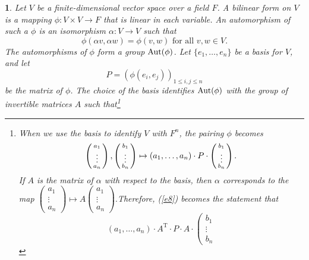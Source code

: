 \documentclass[a4paper,11pt,final]{memoir}%
\newtheorem{plain}[X]{}
\theoremstyle{nonumberplain}
\begin{document}
\begin{plain}
\label{bd3f}Let $V$ be a finite-dimensional vector space over a field $F$. A
bilinear form on $V$ is a mapping $\phi\colon V\times V\rightarrow F$ that is
linear in each variable. An \emph{automorphism}%
of such a $\phi$ is an isomorphism $\alpha\colon V\rightarrow V$ such that%
\begin{equation}
\phi(\alpha v,\alpha w)=\phi(v,w)\text{ for all }v,w\in V. \label{e8}%
\end{equation}
The automorphisms of $\phi$ form a group $\operatorname{Aut}(\phi)$. Let $\{e_{1}%
,\ldots,e_{n}\}$ be a basis for $V$, and let%
\[
P=(\phi(e_{i},e_{j}))_{1\leq i,j\leq n}%
\]
be the matrix of $\phi$. The choice of the basis identifies $\operatorname{Aut}(\phi)$ with
the group of invertible matrices $A$ such that\footnote{When we use the basis
to identify $V$ with $F^{n}$, the pairing $\phi$ becomes%
\[
\left(
\begin{smallmatrix}
\vphantom{b}a_{1}\\
\vdots\\
\vphantom{b}a_{n}%
\end{smallmatrix}
\right)  ,\left(
\begin{smallmatrix}
b_{1}\\
\vdots\\
b_{n}%
\end{smallmatrix}
\right)  \mapsto(a_{1},\ldots,a_{n})\cdot P\cdot\left(
\begin{smallmatrix}
b_{1}\\
\vdots\\
b_{n}%
\end{smallmatrix}
\right)  .
\]
If $A$ is the matrix of $\alpha$ with respect to the basis, then $\alpha$
corresponds to the map $\left(
\begin{smallmatrix}
a_{1}\\
\vdots\\
a_{n}%
\end{smallmatrix}
\right)  \mapsto A\left(
\begin{smallmatrix}
a_{1}\\
\vdots\\
a_{n}%
\end{smallmatrix}
\right)  .$Therefore, (\ref{e8}) becomes the statement that%
\[
(a_{1},\ldots,a_{n})\cdot A^{\mathrm{T}}\cdot P\cdot A\cdot\left(
\begin{smallmatrix}
b_{1}\\
\vdots\\
b_{n}%
\end{smallmatrix}
\]}
\end{plain}
\end{document}
